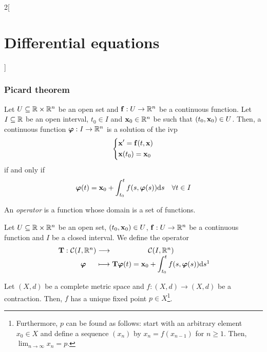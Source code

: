 \documentclass[../../../main.tex]{subfiles}
\begin{document}
\begin{multicols}{2}[\section{Differential equations}]
    \subsubsection{Picard theorem}
    \begin{prop}
        Let $U\subseteq\mathbb{R}\times\mathbb{R}^n$ be an open set and $\boldsymbol{\mathrm{f}}:U\rightarrow\mathbb{R}^n$ be a continuous function. Let $I\subseteq\mathbb{R}$ be an open interval, $t_0\in I$ and $\boldsymbol{\mathrm{x}}_0\in\mathbb{R}^n$ be such that $(t_0,\boldsymbol{\mathrm{x}}_0)\in U$. Then, a continuous function $\boldsymbol{\mathrm{\varphi}}:I\rightarrow\mathbb{R}^n$ is a solution of the ivp
        \begin{equation}
            \left\{
            \begin{aligned}
                 & \boldsymbol{\mathrm{x}}'=\boldsymbol{\mathrm{f}}(t,\boldsymbol{\mathrm{x}}) \\
                 & \boldsymbol{\mathrm{x}}(t_0)=\boldsymbol{\mathrm{x}}_0
            \end{aligned}
            \right.
            \label{DE_ivp}
        \end{equation}
        if and only if $$\boldsymbol{\mathrm{\varphi}}(t)=\boldsymbol{\mathrm{x}}_0+\int_{t_0}^tf(s,\boldsymbol{\mathrm{\varphi}}(s))\dd s\quad\forall t\in I$$
    \end{prop}
    \begin{definition}
        An \textit{operator} is a function whose domain is a set of functions.
    \end{definition}
    \begin{definition}
        Let $U\subseteq\mathbb{R}\times\mathbb{R}^n$ be an open set, $(t_0,\boldsymbol{\mathrm{x}}_0)\in U$, $\boldsymbol{\mathrm{f}}:U\rightarrow\mathbb{R}^n$ be a continuous function and $I$ be a closed interval. We define the operator
        $$
            \function{\vf{T}}
            {\mathcal{C}(I,\RR^n)}
            {\mathcal{C}(I,\RR^n)}
            {\vf{\varphi}}
            {\displaystyle\vf{T}\vf{\varphi}(t)=\vf{x}_0+\int_{t_0}^tf(s,\vf{\varphi}(s))\dd s\footnotemark}
        $$
    \end{definition}
    \begin{theorem}
        Let $(X,d)$ be a complete metric space and $f:(X,d)\rightarrow (X,d)$ be a contraction. Then, $f$ has a unique fixed point $p\in X$\footnote{Furthermore, $p$ can be found as follows: start with an arbitrary element $x_0\in X$ and define a sequence $(x_n)$ by $x_n=f(x_{n-1})$ for $n\geq 1$. Then, $\displaystyle\lim_{n\to\infty} x_n=p$.}.
    \end{theorem}
    \begin{corollary}

\end{corollary}
\end{multicols}
\end{document}
